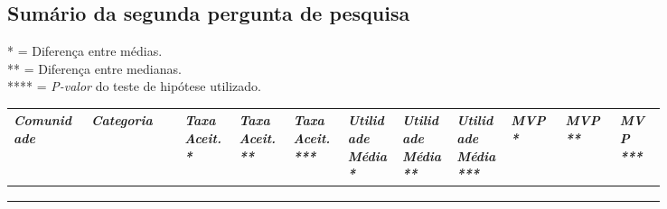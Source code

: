 \begin{landscape}

\chapter{Sumário da segunda pergunta de pesquisa}
\label{app:q2}
\small
* = Diferença entre médias. \\
** = Diferença entre medianas. \\
**** = \textit{P-valor} do teste de hipótese utilizado. 

\begin{longtabu}{@{}
	p{0.1\linewidth}
	p{0.12\linewidth}
	P{0.07\linewidth}
	P{0.07\linewidth}
	P{0.07\linewidth}
	P{0.07\linewidth}
	P{0.07\linewidth}
	P{0.07\linewidth}
	P{0.07\linewidth}
	P{0.07\linewidth}
	p{0.06\linewidth}@{}}
\toprule
\textit{Comunidade}  & \textit{Categoria}  & \textit{Taxa Aceit. *} & \textit{Taxa Aceit. **} & \textit{Taxa Aceit. ***} & \textit{Utilidade Média *} & \textit{Utilidade Média **} & \textit{Utilidade Média *** }& \textit{MVP * }& \textit{MVP **} & \textit{MVP ***} \\ \midrule
\endhead

\\ \hline
\endfoot

\\
\endlastfoot


\end{longtabu}
\end{landscape}
